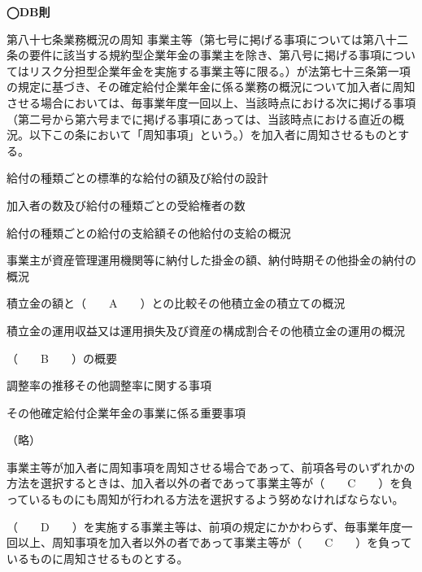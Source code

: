 \begin{fillblank}[年金1 2024 問題1(1)]
  \noindent \textbf{◯DB則}
  \begin{lawstructure}
    \begin{lawarticle}{第八十七条}{業務概況の周知}
      事業主等（第七号に掲げる事項については第八十二条の要件に該当する規約型企業年金の事業主を除き、第八号に掲げる事項についてはリスク分担型企業年金を実施する事業主等に限る。）が法第七十三条第一項の規定に基づき、その確定給付企業年金に係る業務の概況について加入者に周知させる場合においては、毎事業年度一回以上、当該時点における次に掲げる事項（第二号から第六号までに掲げる事項にあっては、当該時点における直近の概況。以下この条において「周知事項」という。）を加入者に周知させるものとする。

      給付の種類ごとの標準的な給付の額及び給付の設計

      加入者の数及び給付の種類ごとの受給権者の数

      給付の種類ごとの給付の支給額その他給付の支給の概況

      事業主が資産管理運用機関等に納付した掛金の額、納付時期その他掛金の納付の概況

      積立金の額と（　　A　　）との比較その他積立金の積立ての概況

      積立金の運用収益又は運用損失及び資産の構成割合その他積立金の運用の概況

      （　　B　　）の概要

      調整率の推移その他調整率に関する事項

      その他確定給付企業年金の事業に係る重要事項

      （略）

      事業主等が加入者に周知事項を周知させる場合であって、前項各号のいずれかの方法を選択するときは、加入者以外の者であって事業主等が（　　C　　）を負っているものにも周知が行われる方法を選択するよう努めなければならない。

      （　　D　　）を実施する事業主等は、前項の規定にかかわらず、毎事業年度一回以上、周知事項を加入者以外の者であって事業主等が（　　C　　）を負っているものに周知させるものとする。
    \end{lawarticle}
  \end{lawstructure}
\end{fillblank}

